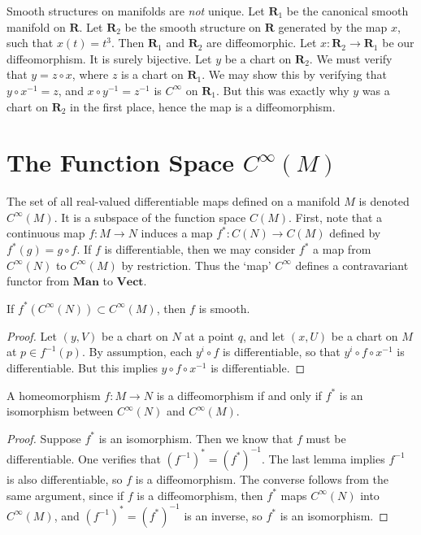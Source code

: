 \begin{example}
    Smooth structures on manifolds are {\it not} unique. Let $\mathbf{R}_1$ be the canonical smooth manifold on $\mathbf{R}$. Let $\mathbf{R}_2$ be the smooth structure on $\mathbf{R}$ generated by the map $x$, such that $x(t) = t^3$. Then $\mathbf{R}_1$ and $\mathbf{R}_2$ are diffeomorphic. Let $x:\mathbf{R}_2 \to \mathbf{R}_1$ be our diffeomorphism. It is surely bijective. Let $y$ be a chart on $\mathbf{R}_2$. We must verify that $y = z \circ x$, where $z$ is a chart on $\mathbf{R}_1$. We may show this by verifying that $y \circ x^{-1} = z$, and $x \circ y^{-1} = z^{-1}$ is $C^\infty$ on $\mathbf{R}_1$. But this was exactly why $y$ was a chart on $\mathbf{R}_2$ in the first place, hence the map is a diffeomorphism.
\end{example}

\section{The Function Space $C^\infty(M)$}

The set of all real-valued differentiable maps defined on a manifold $M$ is denoted $C^\infty(M)$. It is a subspace of the function space $C(M)$. First, note that a continuous map $f: M \to N$ induces a map $f^*: C(N) \to C(M)$ defined by $f^*(g) = g \circ f$. If $f$ is differentiable, then we may consider $f^*$ a map from $C^\infty(N)$ to $C^\infty(M)$ by restriction. Thus the `map' $C^\infty$ defines a contravariant functor from $\textbf{Man}$ to $\textbf{Vect}$.

\begin{lemma}
    If $f^*(C^\infty(N)) \subset C^\infty(M)$, then $f$ is smooth.
\end{lemma}
\begin{proof}
    Let $(y,V)$ be a chart on $N$ at a point $q$, and let $(x,U)$ be a chart on $M$ at $p \in f^{-1}(p)$. By assumption, each $y^i \circ f$ is differentiable, so that $y^i \circ f \circ x^{-1}$ is differentiable. But this implies $y \circ f \circ x^{-1}$ is differentiable.
\end{proof}

\begin{theorem}
    A homeomorphism $f:M \to N$ is a diffeomorphism if and only if $f^*$ is an isomorphism between $C^\infty(N)$ and $C^\infty(M)$.
\end{theorem}
\begin{proof}
    Suppose $f^*$ is an isomorphism. Then we know that $f$ must be differentiable. One verifies that $(f^{-1})^* = (f^*)^{-1}$. The last lemma implies $f^{-1}$ is also differentiable, so $f$ is a diffeomorphism. The converse follows from the same argument, since if $f$ is a diffeomorphism, then $f^*$ maps $C^\infty(N)$ into $C^\infty(M)$, and $(f^{-1})^* = (f^*)^{-1}$ is an inverse, so $f^*$ is an isomorphism.
\end{proof}

